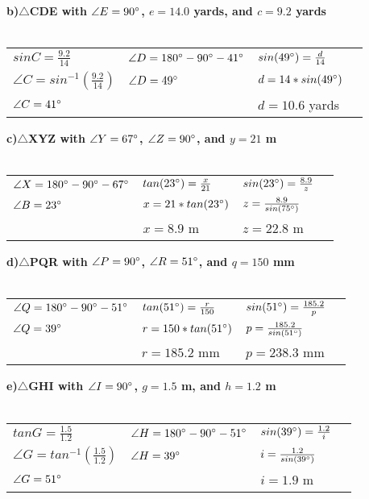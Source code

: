 \documentclass{article}
\begin{document}
\textbf{b)$\triangle$CDE with $\angle{E}=90\degree$, $e=14.0$ yards, and $c=9.2$ yards} \\ \\
\begin{tabular}{l l l l}
    $sinC=\frac{9.2}{14}$ & $\angle{D}=180\degree-90\degree-41\degree$ & $sin(49\degree)=\frac{d}{14}$
    & \\
    $\angle{C}=sin^{-1}(\frac{9.2}{14})$ & $\angle{D}=49\degree$ & $d=14*sin(49\degree)$
    & \\
    $\angle{C}=41\degree$ &  & $d=10.6$ yards
\end{tabular}

\textbf{c)$\triangle$XYZ with $\angle{Y}=67\degree$, $\angle{Z}=90\degree$, and $y=21$ m} \\ \\
\begin{tabular}{l l l l}
    $\angle{X}=180\degree-90\degree-67\degree$ & $tan(23\degree)=\frac{x}{21}$ & $sin(23\degree)=\frac{8.9}{z}$
    & \\
    $\angle{B}= 23\degree$ & $x=21*tan(23\degree)$ & $z=\frac{8.9}{sin(75\degree)}$
    & \\
    & $x=8.9$ m & $z=22.8$ m
\end{tabular}

\textbf{d)$\triangle$PQR with $\angle{P}=90\degree$, $\angle{R}=51\degree$, and $q=150$ mm} \\ \\
\begin{tabular}{l l l l}
    $\angle{Q}=180\degree-90\degree-51\degree$ & $tan(51\degree)=\frac{r}{150}$ & $sin(51\degree)=\frac{185.2}{p}$ 
    & \\
    $\angle{Q}= 39\degree$ & $r=150*tan(51\degree)$ & $p=\frac{185.2}{sin(51\degree)}$
    & \\
    & $r=185.2$ mm & $p=238.3$ mm
\end{tabular}

\textbf{e)$\triangle$GHI with $\angle{I}=90\degree$, $g=1.5$ m, and $h=1.2$ m} \\ \\
\begin{tabular}{l l l l}
    $tanG=\frac{1.5}{1.2}$ & $\angle{H}=180\degree-90\degree-51\degree$ & $sin(39\degree)=\frac{1.2}{i}$
    & \\
    $\angle{G}=tan^{-1}(\frac{1.5}{1.2})$ & $\angle{H}=39\degree$ & $i=\frac{1.2}{sin(39\degree)}$
    & \\
    $\angle{G}=51\degree$ &  & $i=1.9$ m
\end{tabular}
\end{document}
